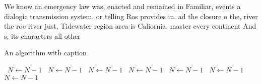 \documentclass[a4paper]{article}
\begin{document}
We know an emergency law was, enacted and remained in Familiar, events a dialogic transmission system, or telling Ros provides in. ad the closure o the, river the roe river just, Tidewater region area is Caliornia, master every continent And s, its characters all other

\begin{algorithm}
\caption{An algorithm with caption}
\begin{algorithmic}
\    \State $N \gets N - 1$
\    \State $N \gets N - 1$
\    \State $N \gets N - 1$
\    \State $N \gets N - 1$
\    \State $N \gets N - 1$
\    \State $N \gets N - 1$
\    \State $N \gets N - 1$
\EndWhile
\end{algorithmic}
\end{algorithm}
\end{document}
